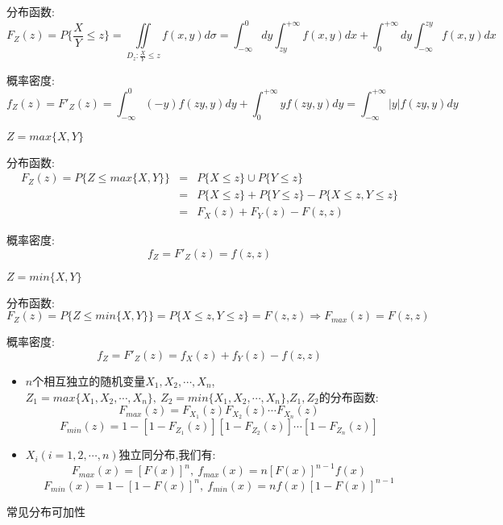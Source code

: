 \begin{definition}[连续型多维随机变量函数的分布]
	分布函数: 
	$$F_{Z}(z)=P\{\dfrac{X}{Y}\leq z\}=\iint\limits_{D_{z}:\frac{X}{Y}\leq z}f(x,y)d\sigma=\int_{-\infty}^{0}dy\int_{zy}^{+\infty}f(x,y)dx+\int_{0}^{+\infty}dy\int_{-\infty}^{zy}f(x,y)dx$$
	
	概率密度: 
	$$f_{Z}(z)=F'_{Z}(z)=\int_{-\infty}^{0}(-y)f(zy,y)dy+\int_{0}^{+\infty}yf(zy,y)dy=\int_{-\infty}^{+\infty}|y|f(zy,y)dy$$
	
	
	$Z=max\{X,Y\}$
	
	分布函数: 
	\begin{eqnarray*}
		F_{Z}(z)=P\{Z\leq max\{X,Y\}\}&=&P\{X\leq z\}\cup P\{Y\leq z\}\\
		&=&P\{X\leq z\}+P\{Y\leq z\}-P\{X\leq z,Y\leq z\}\\
		&=&F_{X}(z)+F_{Y}(z)-F(z,z)
	\end{eqnarray*}

	
	概率密度: 
	$$f_{Z}=F'_{Z}(z)=f(z,z)$$
	
	
	$Z=min\{X,Y\}$
	
	分布函数: 
	$$F_{Z}(z)=P\{Z\leq min\{X,Y\}\}=P\{X\leq z,Y\leq z\}=F(z,z)\Rightarrow F_{max}(z)=F(z,z)$$
	
	概率密度: 
	$$f_{Z}=F'_{Z}(z)=f_{X}(z)+f_{Y}(z)-f(z,z)$$
	\begin{anymark}[注]
		\begin{itemize}
			\item  $n$个相互独立的随机变量$X_{1},X_{2},\cdots,X_{n}$,$Z_{1}=max\{X_{1},X_{2},\cdots,X_{n}\},\ Z_{2}=min\{X_{1},X_{2},\cdots,X_{n}\}$,$Z_{1},Z_{2}$的分布函数: 
			$$F_{max}(z)=F_{X_{1}}(z)F_{X_{2}}(z)\cdots F_{X_{n}}(z)$$
			$$F_{min}(z)=1-[1-F_{Z_{1}}(z)][1-F_{Z_{2}}(z)]\cdots[1-F_{Z_{n}}(z)]              $$
			\item $X_{i}(i=1,2,\cdots,n)$独立同分布,我们有: 
			$$F_{max}(x)=[F(x)]^n,\ f_{max}(x)=n[F(x)]^{n-1}f(x)$$
			$$F_{min}(x)=1-[1-F(x)]^n,\ f_{min}(x)=nf(x)[1-F(x)]^{n-1}$$
		\end{itemize}
	\end{anymark}
\end{definition}
\begin{table}[ht]
	\centering
	\caption{常见分布可加性}
	\label{table: 常见分布可加性}
\end{table}
